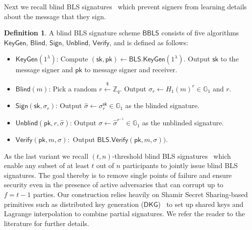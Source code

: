 \documentclass[11pt,letterpaper]{article}
\theoremstyle{definition}
\newtheorem{definition}[theorem]{Definition}
\newcommand{\GG}{\mathbb{G}}
\newcommand{\ZZ}{\mathbb{Z}}
\newcommand{\pk}{\mathsf{pk}}
\newcommand{\sk}{\mathsf{sk}}
\newcommand{\pick}{\xleftarrow{\scriptscriptstyle \$}}
\newcommand{\bls}{\mathsf{BLS}}
\newcommand{\bbls}{\mathsf{BBLS}}
\newcommand{\keygen}{\mathsf{KeyGen}}
\newcommand{\sign}{\mathsf{Sign}}
\newcommand{\verify}{\mathsf{Verify}}
\newcommand{\blind}{\mathsf{Blind}}
\newcommand{\unblind}{\mathsf{Unblind}}
\newcommand{\dkg}{\mathsf{DKG}}
\begin{document}
Next we recall blind BLS signatures~\cite{boldyreva2003threshold} which prevent
signers from learning details about the message that they sign.

\begin{definition}

  A blind BLS signature scheme $\bbls$ consists of five algorithms $\keygen$,
  $\blind$, $\sign$, $\unblind$, $\verify$, and is defined as follows:

  \begin{itemize}

    \item[] $\keygen(1^\lambda)$: Compute $(\sk, \pk) \leftarrow
        \bls.\keygen(1^\lambda)$. Output $\sk$ to the message signer and $\pk$
      to message signer and receiver.

    \item[] $\blind(m)$: Pick a random $r \pick \ZZ_q$. Output $\sigma_r
        \leftarrow H_1(m)^r \in \GG_1$ and $r$.

    \item[] $\sign(\sk, \sigma_r)$: Output $\widehat{\sigma} \leftarrow
        \sigma_r^\sk \in \GG_1$ as the blinded signature.

    \item[] $\unblind(\pk, r, \widehat{\sigma})$: Output $\sigma \leftarrow
        \widehat{\sigma}^{r^{-1}} \in \GG_1$ as the unblinded signature.

    \item[] $\verify(\pk, m, \sigma):$ Output $\bls.\verify(\pk, m, \sigma))$.

  \end{itemize}

\end{definition}


As the last variant we recall $(t,n)$-threshold blind BLS
signatures~\cite{boldyreva2003threshold} which enable any subset of at least $t$
out of $n$ participants to jointly issue blind BLS signatures. The goal thereby
is to remove single points of failure and ensure security even in the presence
of active adversaries that can corrupt up to $f=t-1$ parties. Our construction
relies heavily on Shamir Secret Sharing-based primitives such as distributed key
generation ($\dkg$)~\cite{gennaro2006secure,kate2012distributed} to set up shared
keys and Lagrange interpolation to combine partial signatures. We refer the
reader to the literature for further details.

\end{document}
